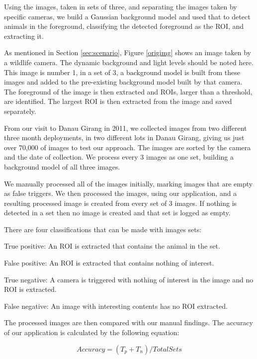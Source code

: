 		Using the images, taken in sets of three, and separating the images taken by specific cameras, we build a Gaussian background model and used that to detect animals in the foreground, classifying the detected foreground as the ROI, and extracting it.
	
		As mentioned in Section \ref{sec:scenario}, Figure \ref{origimg} shows an image taken by a wildlife camera. The dynamic background and light levels should be noted here. This image is number 1, in a set of 3, a background model is built from these images and added to the pre-existing background model built by that camera. The foreground of the image is then extracted and ROIs, larger than a threshold, are identified. The largest ROI is then extracted from the image and saved separately.
	
		From our visit to Danau Girang in 2011, we collected images from two different three month deployments, in two different lots in Danau Girang, giving us just over 70,000 of images to test our approach. The images are sorted by the camera and the date of collection. We process every 3 images as one set, building a background model of all three images.
		
		We manually processed all of the images initially, marking images that are empty as false triggers. We then processed the images, using our application, and a resulting processed image is created from every set of 3 images. If nothing is detected in a set then no image is created and that set is logged as empty. 
		
		There are four classifications that can be made with images sets:
		\begin{description}
			\item True positive: An ROI is extracted that contains the animal in the set.
			\item False positive: An ROI is extracted that contains nothing of interest.
			\item True negative: A camera is triggered with nothing of interest in the image and no ROI is extracted.
			\item False negative: An image with interesting contents has no ROI extracted.
		\end{description}
		
		The processed images are then compared with our manual findings. The accuracy of our application is calculated by the following equation:
		
		\begin{equation}Accuracy = (T_{p} + T_{n})/Total Sets\end{equation}
		
